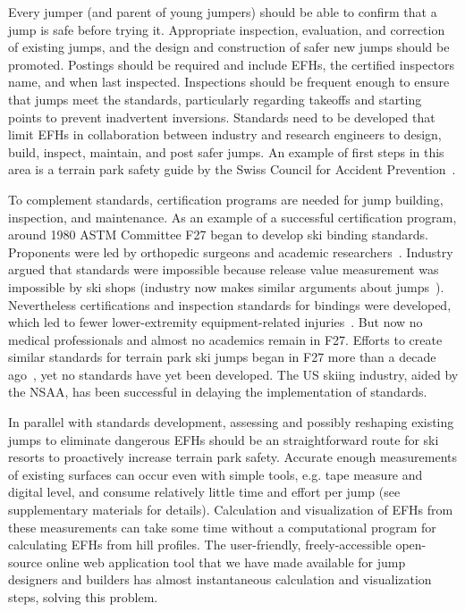 \documentclass[smallextended]{svjour3}       %
\begin{document}
Every jumper (and parent of young jumpers) should be able to confirm that a
jump is safe before trying it. Appropriate inspection, evaluation, and
correction of existing jumps, and the design and construction of safer new
jumps should be promoted.  Postings should be required and include EFHs, the certified
inspectors name, and when last inspected.  Inspections should be frequent
enough to ensure that jumps meet the standards, particularly regarding takeoffs
and starting points to prevent inadvertent inversions. Standards need to be
developed that limit EFHs in collaboration between industry and research
engineers to design, build, inspect, maintain, and post safer jumps. An example
of first steps in this area is a terrain park safety guide by the Swiss Council
for Accident Prevention~\cite{Heer2019}.

To complement standards, certification programs are needed for jump building,
inspection, and maintenance. As an example of a successful certification
program, around 1980 ASTM Committee F27 began to develop ski binding standards.
Proponents were led by orthopedic surgeons and academic
researchers~\cite{Bahniuk1996}. Industry argued that standards were impossible
because release value measurement was impossible by ski shops (industry now
makes similar arguments about jumps~\cite{NSAA2015}). Nevertheless certifications and
inspection standards for bindings were developed, which led to fewer
lower-extremity equipment-related injuries~\cite{Bahniuk1996}. But now no medical professionals
and almost no academics remain in F27. Efforts to create similar standards for
terrain park ski jumps began in F27 more than a decade ago~\cite{SAM2011}, yet
no standards have yet been developed. The US skiing industry, aided by the NSAA, has
been successful in delaying the implementation of standards.

In parallel with standards development, assessing and possibly reshaping
existing jumps to eliminate dangerous EFHs should be an straightforward route
for ski resorts to proactively increase terrain park safety. Accurate enough
measurements of existing surfaces can occur even with simple tools, e.g. tape
measure and digital level, and consume relatively little time and effort per
jump (see supplementary materials for details). Calculation and visualization
of EFHs from these measurements can take some time without a computational
program for calculating EFHs from hill profiles. The user-friendly,
freely-accessible open-source online web application tool that 
we have made available for jump designers and builders has almost instantaneous calculation and visualization steps, solving this problem.
\end{document}
